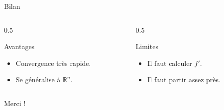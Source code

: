 \documentclass{beamer}
\begin{document}
\begin{frame}{Bilan}
  \begin{columns}
    \begin{column}{0.5\textwidth}
      \begin{exampleblock}{Avantages}
        \begin{itemize}
          \item Convergence très rapide.
          \item Se généralise à $\mathbb{R}^n$.
        \end{itemize}
      \end{exampleblock}
    \end{column}
    \begin{column}{0.5\textwidth}
      \begin{alertblock}{Limites}
        \begin{itemize}
          \item Il faut calculer $f'$.
          \item Il faut partir assez près.
        \end{itemize}
      \end{alertblock}
    \end{column}
  \end{columns}
\end{frame}

\begin{frame}
  \begin{center}
    \Huge Merci !
  \end{center}
\end{frame}
\end{document}
